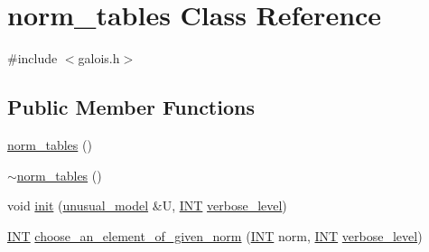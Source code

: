 \hypertarget{classnorm__tables}{}\section{norm\+\_\+tables Class Reference}
\label{classnorm__tables}


{\ttfamily \#include $<$galois.\+h$>$}

\subsection*{Public Member Functions}
\begin{DoxyCompactItemize}
\item 
\mbox{\hyperlink{classnorm__tables_a19c3b94e0a0cd2e956490a7af950034b}{norm\+\_\+tables}} ()
\item 
\mbox{\hyperlink{classnorm__tables_a0caff2045f439b443c0fc36b9e5b4c27}{$\sim$norm\+\_\+tables}} ()
\item 
void \mbox{\hyperlink{classnorm__tables_a6b51503fa635de7a11cd9abb1cca331c}{init}} (\mbox{\hyperlink{classunusual__model}{unusual\+\_\+model}} \&U, \mbox{\hyperlink{galois_8h_a09fddde158a3a20bd2dcadb609de11dc}{I\+NT}} \mbox{\hyperlink{simeon_8_c_a818073fbcc2f439e7c56952f67386122}{verbose\+\_\+level}})
\item 
\mbox{\hyperlink{galois_8h_a09fddde158a3a20bd2dcadb609de11dc}{I\+NT}} \mbox{\hyperlink{classnorm__tables_ade4d3a3b1e103c6005968dbbcdcc5aed}{choose\+\_\+an\+\_\+element\+\_\+of\+\_\+given\+\_\+norm}} (\mbox{\hyperlink{galois_8h_a09fddde158a3a20bd2dcadb609de11dc}{I\+NT}} norm, \mbox{\hyperlink{galois_8h_a09fddde158a3a20bd2dcadb609de11dc}{I\+NT}} \mbox{\hyperlink{simeon_8_c_a818073fbcc2f439e7c56952f67386122}{verbose\+\_\+level}})
\end{DoxyCompactItemize}

